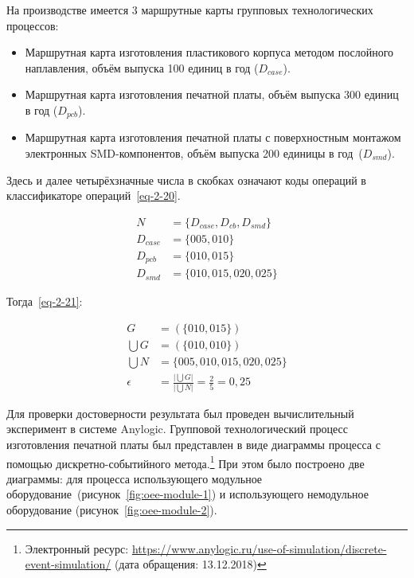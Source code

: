 На производстве имеется 3 маршрутные карты групповых технологических процессов:

\begin{itemize}
	\item Маршрутная карта изготовления пластикового корпуса методом послойного наплавления, объём выпуска 100 единиц в год ($D_{case}$).
	\item Маршрутная карта изготовления печатной платы, объём выпуска 300 единиц в год ($D_{pcb}$).
	\item Маршрутная карта изготовления печатной платы с поверхностным монтажом электронных SMD-компонентов, объём выпуска 200 единицы в год~($D_{smd}$).
\end{itemize}

Здесь и далее четырёхзначные числа в скобках означают коды операций в классификаторе операций~\cref{eq-2-20}.

\begin{equation}
\begin{split}
	N &= \{D_{case}, D_{cb}, D_{smd}\} \\
	D_{case} &= \{005, 010\} \\
	D_{pcb} &= \{010, 015\} \\
	D_{smd} &= \{010, 015, 020, 025\}
\end{split}
\label{eq-2-20}
\end{equation}

\noindent Тогда~\cref{eq-2-21}:

\begin{equation}
\begin{split}
G &= (\{010, 015\}) \\
\bigcup G &= (\{010, 010\}) \\
\bigcup N &= \{005, 010, 015, 020, 025\} \\
\epsilon &= \frac{\big|\bigcup G \big|}{\big|\bigcup N \big|} = \frac{2}{5} = 0,25
\end{split}
\label{eq-2-21}
\end{equation}

Для проверки достоверности результата был проведен вычислительный эксперимент в системе Anylogic. Групповой технологический процесс изготовления печатной платы был представлен в виде диаграммы процесса с помощью дискретно-событийного метода.\footnote{Электронный ресурс: \url{https://www.anylogic.ru/use-of-simulation/discrete-event-simulation/} (дата обращения: 13.12.2018)} При этом было построено две диаграммы: для процесса использующего модульное оборудование~(рисунок~\cref{fig:oee-module-1}) и использующего немодульное оборудование (рисунок~\cref{fig:oee-module-2}).

